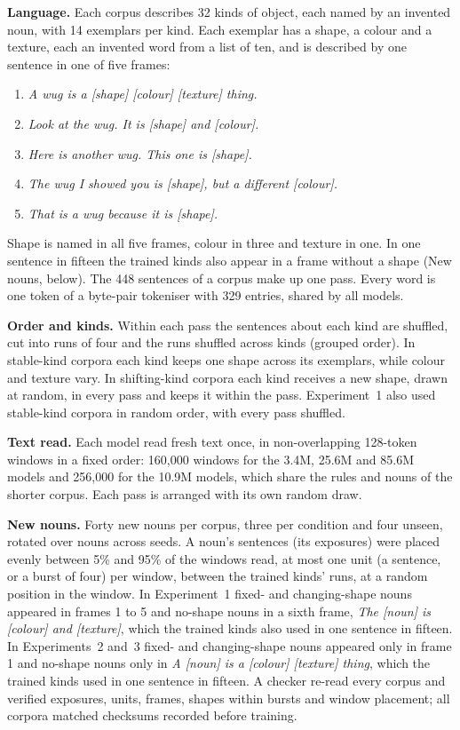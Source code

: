 \FloatBarrier
{}\label{app:lang}
\setcounter{table}{0}\renewcommand{\thetable}{\thesection\arabic{table}}
\setcounter{figure}{0}\renewcommand{\thefigure}{\thesection\arabic{figure}}
\textbf{Language.} Each corpus describes 32 kinds of object, each named by an invented noun, with 14 exemplars per kind. Each exemplar has a shape, a colour and a texture, each an invented word from a list of ten, and is described by one sentence in one of five frames:
\begin{enumerate}[itemsep=0pt,topsep=2pt]
\item \emph{A wug is a [shape] [colour] [texture] thing.}
\item \emph{Look at the wug. It is [shape] and [colour].}
\item \emph{Here is another wug. This one is [shape].}
\item \emph{The wug I showed you is [shape], but a different [colour].}
\item \emph{That is a wug because it is [shape].}
\end{enumerate}
Shape is named in all five frames, colour in three and texture in one. In one sentence in fifteen the trained kinds also appear in a frame without a shape (New nouns, below). The 448 sentences of a corpus make up one pass. Every word is one token of a byte-pair tokeniser with 329 entries, shared by all models.

\textbf{Order and kinds.} Within each pass the sentences about each kind are shuffled, cut into runs of four and the runs shuffled across kinds (grouped order). In stable-kind corpora each kind keeps one shape across its exemplars, while colour and texture vary. In shifting-kind corpora each kind receives a new shape, drawn at random, in every pass and keeps it within the pass. Experiment~1 also used stable-kind corpora in random order, with every pass shuffled.

\textbf{Text read.} Each model read fresh text once, in non-overlapping 128-token windows in a fixed order: 160,000 windows for the 3.4M, 25.6M and 85.6M models and 256,000 for the 10.9M models, which share the rules and nouns of the shorter corpus. Each pass is arranged with its own random draw.

\textbf{New nouns.} Forty new nouns per corpus, three per condition and four unseen, rotated over nouns across seeds. A noun's sentences (its exposures) were placed evenly between 5\% and 95\% of the windows read, at most one unit (a sentence, or a burst of four) per window, between the trained kinds' runs, at a random position in the window. In Experiment~1 fixed- and changing-shape nouns appeared in frames 1 to 5 and no-shape nouns in a sixth frame, \emph{The [noun] is [colour] and [texture]}, which the trained kinds also used in one sentence in fifteen. In Experiments~2 and~3 fixed- and changing-shape nouns appeared only in frame 1 and no-shape nouns only in \emph{A [noun] is a [colour] [texture] thing}, which the trained kinds used in one sentence in fifteen. A checker re-read every corpus and verified exposures, units, frames, shapes within bursts and window placement; all corpora matched checksums recorded before training.

